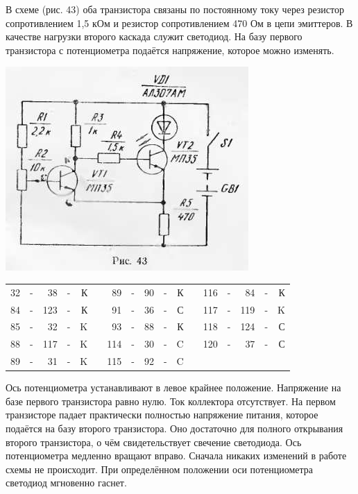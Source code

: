 \documentclass[12pt]{article}
\begin{document}
В схеме (рис. 43) оба транзистора связаны по постоянному току через резистор сопротивлением 1,5 кОм и резистор сопротивлением 470 Ом в цепи эмиттеров. В качестве нагрузки второго каскада служит светодиод. На базу первого транзистора с потенциометра подаётся напряжение, которое можно изменять.

\hspace*{0.7cm}\includegraphics[scale=0.99, angle=1]{ekon3_043_1}

\newpage

\hrulefill

\begin{tabular}{r c r c r p{2cm} r c r c r p{2cm} r c r c r}
32 & - &  38 & - & К &     & 89  & - & 90 & - & К &    & 116 & - & 84  & - & К\\
84 & - & 123 & - & К &     & 91  & - & 36 & - & С &    & 117 & - & 119 & - & K\\
85 & - &  32 & - & K &     & 93  & - & 88 & - & К &    & 118 & - & 124 & - & С\\
88 & - & 117 & - & K &     & 114 & - & 30 & - & C &    & 120 & - &  37 & - & С\\
89 & - &  31 & - & K &     & 115 & - & 92 & - & C &    &     &   &     &   &  \\
\end{tabular}

\hrulefill

Ось потенциометра устанавливают в левое крайнее положение. Напряжение на базе первого транзистора равно нулю. Ток коллектора отсутствует. На первом транзисторе падает практически полностью напряжение питания, которое подаётся на базу второго транзистора. Оно достаточно для полного открывания второго транзистора, о чём свидетельствует свечение светодиода. Ось потенциометра медленно вращают вправо. Сначала никаких изменений в работе схемы не происходит. При определённом положении оси потенциометра светодиод мгновенно гаснет.
\end{document}
